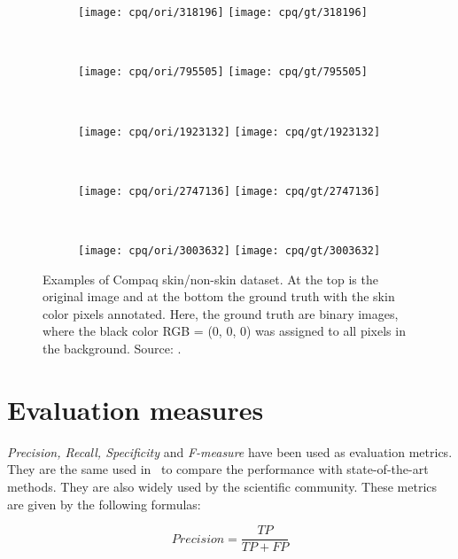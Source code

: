 \begin{figure}[H]
    \centering
    \begin{subfigure}[t]{0.269\textwidth}
        \texttt{[image: cpq/ori/318196]}
        \texttt{[image: cpq/gt/318196]}
    \end{subfigure}
    ~
    \begin{subfigure}[t]{0.214\textwidth}
        \texttt{[image: cpq/ori/795505]}
        \texttt{[image: cpq/gt/795505]}
    \end{subfigure}
    ~
    \begin{subfigure}[t]{0.132\textwidth}
        \texttt{[image: cpq/ori/1923132]}
        \texttt{[image: cpq/gt/1923132]}
    \end{subfigure}
    ~
    \begin{subfigure}[t]{0.14\textwidth}
        \texttt{[image: cpq/ori/2747136]}
        \texttt{[image: cpq/gt/2747136]}
    \end{subfigure}
    ~
    \begin{subfigure}[t]{0.12\textwidth}
        \texttt{[image: cpq/ori/3003632]}
        \texttt{[image: cpq/gt/3003632]}
    \end{subfigure}
    \caption[Examples of Compaq skin/non-skin dataset]{Examples of Compaq skin/non-skin dataset. At the top is the original image and at the bottom the ground truth with the skin color pixels annotated. Here, the ground truth are binary images, where the black color RGB = (0, 0, 0) was assigned to all pixels in the background. Source: \citet{jones:02}.}
    \label{fig:compaq_dataset_example}
\end{figure}



\section{Evaluation measures}
\label{sec:evaluation_measures}

\textit{Precision, Recall, Specificity} and \textit{F-measure} have been used as evaluation metrics. They are the same used in~\citet{brancati:17} to compare the performance with state-of-the-art methods. They are also widely used by the scientific community. These metrics are given by the following formulas:

\begin{equation*}
    Precision = \frac{TP}{TP + FP}
    \label{eq:precision}
\end{equation*}

